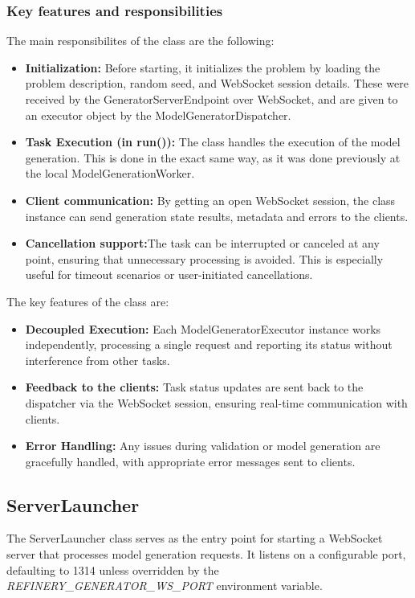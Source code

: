 		\subsubsection{Key features and responsibilities}\label{Key features and responsibilites}
			The main responsibilites of the class are the following:
			\begin{itemize}
				\item \textbf{Initialization:} Before starting, it initializes the problem by loading the problem description, random seed, and WebSocket session details. These were
				received by the GeneratorServerEndpoint over WebSocket, and are given to an executor object by the ModelGeneratorDispatcher.
				\item \textbf{Task Execution (in run()):} The class handles the execution of the model generation. This is done in the exact same way, as it was done previously at the local ModelGenerationWorker.
				\item \textbf{Client communication:} By getting an open WebSocket session, the class instance can send generation state results, metadata and errors to the clients.
				\item \label{serverexecutorcancel}\textbf{Cancellation support:}The task can be interrupted or canceled at any point, ensuring that unnecessary processing is avoided. This is especially useful for timeout scenarios or user-initiated cancellations.
			\end{itemize}
			The key features of the class are:
			\begin{itemize}
				\item \textbf{Decoupled Execution:} Each ModelGeneratorExecutor instance works independently, processing a single request and reporting its status without interference from other tasks.
				\item \textbf{Feedback to the clients:} Task status updates are sent back to the dispatcher via the WebSocket session, ensuring real-time communication with clients.
				\item \textbf{Error Handling:} Any issues during validation or model generation are gracefully handled, with appropriate error messages sent to clients.
			\end{itemize}

		\subsection{ServerLauncher}\label{Serverlauncher}
		The ServerLauncher class serves as the entry point for starting a WebSocket server that 
		processes model generation requests. It listens on a configurable port, defaulting to 1314 
		unless overridden by the \textit{REFINERY\_GENERATOR\_WS\_PORT} environment variable. 
		
